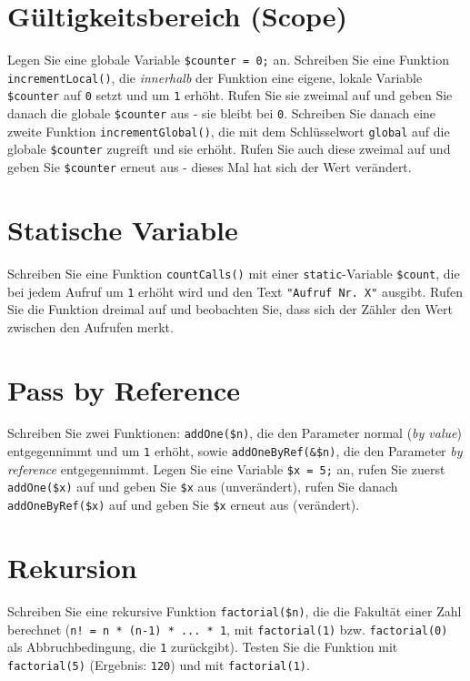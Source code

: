 \documentclass[a4paper,12pt]{article}
\begin{document}
\section{Gültigkeitsbereich (Scope)}

Legen Sie eine globale Variable \texttt{\$counter = 0;} an. Schreiben Sie eine Funktion \texttt{incrementLocal()}, die \emph{innerhalb} der Funktion eine eigene, lokale Variable \texttt{\$counter} auf \texttt{0} setzt und um \texttt{1} erhöht. Rufen Sie sie zweimal auf und geben Sie danach die globale \texttt{\$counter} aus - sie bleibt bei \texttt{0}. Schreiben Sie danach eine zweite Funktion \texttt{incrementGlobal()}, die mit dem Schlüsselwort \texttt{global} auf die globale \texttt{\$counter} zugreift und sie erhöht. Rufen Sie auch diese zweimal auf und geben Sie \texttt{\$counter} erneut aus - dieses Mal hat sich der Wert verändert.

\section{Statische Variable}

Schreiben Sie eine Funktion \texttt{countCalls()} mit einer \texttt{static}-Variable \texttt{\$count}, die bei jedem Aufruf um \texttt{1} erhöht wird und den Text \texttt{"Aufruf Nr. X"} ausgibt. Rufen Sie die Funktion dreimal auf und beobachten Sie, dass sich der Zähler den Wert zwischen den Aufrufen merkt.

\section{Pass by Reference}

Schreiben Sie zwei Funktionen: \texttt{addOne(\$n)}, die den Parameter normal (\emph{by value}) entgegennimmt und um \texttt{1} erhöht, sowie \texttt{addOneByRef(\&\$n)}, die den Parameter \emph{by reference} entgegennimmt. Legen Sie eine Variable \texttt{\$x = 5;} an, rufen Sie zuerst \texttt{addOne(\$x)} auf und geben Sie \texttt{\$x} aus (unverändert), rufen Sie danach \texttt{addOneByRef(\$x)} auf und geben Sie \texttt{\$x} erneut aus (verändert).

\section{Rekursion}

Schreiben Sie eine rekursive Funktion \texttt{factorial(\$n)}, die die Fakultät einer Zahl berechnet (\texttt{n! = n * (n-1) * ... * 1}, mit \texttt{factorial(1)} bzw. \texttt{factorial(0)} als Abbruchbedingung, die \texttt{1} zurückgibt). Testen Sie die Funktion mit \texttt{factorial(5)} (Ergebnis: \texttt{120}) und mit \texttt{factorial(1)}.
\end{document}
